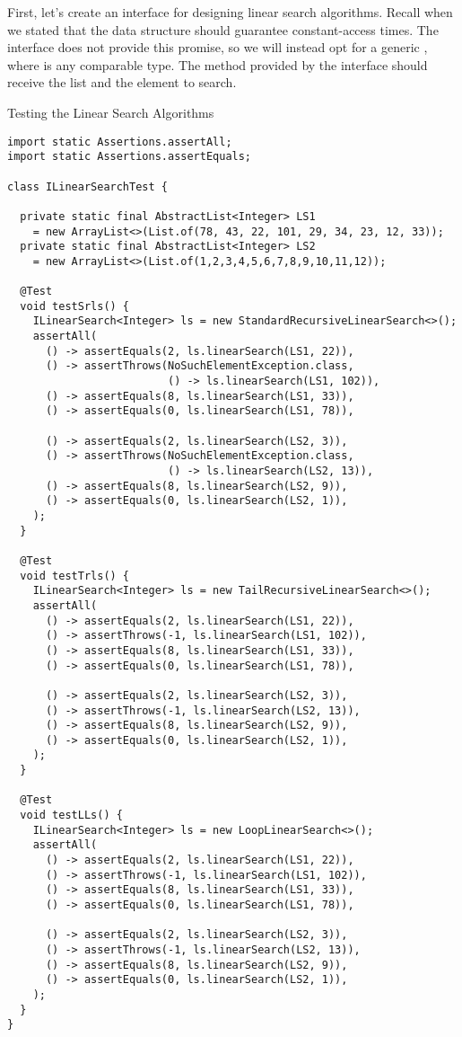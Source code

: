 First, let's create an interface for designing linear search algorithms. Recall when we stated that the data structure should guarantee constant-access times. The  interface does not provide this promise, so we will instead opt for a generic , where  is any comparable type. The method provided by the interface should receive the list and the element to search.

\begin{cl}{Testing the Linear Search Algorithms}
\begin{lstlisting}[language=MyJava]
import static Assertions.assertAll;
import static Assertions.assertEquals;

class ILinearSearchTest {

  private static final AbstractList<Integer> LS1 
    = new ArrayList<>(List.of(78, 43, 22, 101, 29, 34, 23, 12, 33));
  private static final AbstractList<Integer> LS2 
    = new ArrayList<>(List.of(1,2,3,4,5,6,7,8,9,10,11,12));

  @Test
  void testSrls() {
    ILinearSearch<Integer> ls = new StandardRecursiveLinearSearch<>();
    assertAll(
      () -> assertEquals(2, ls.linearSearch(LS1, 22)),
      () -> assertThrows(NoSuchElementException.class, 
                         () -> ls.linearSearch(LS1, 102)),
      () -> assertEquals(8, ls.linearSearch(LS1, 33)),
      () -> assertEquals(0, ls.linearSearch(LS1, 78)),

      () -> assertEquals(2, ls.linearSearch(LS2, 3)),
      () -> assertThrows(NoSuchElementException.class, 
                         () -> ls.linearSearch(LS2, 13)),
      () -> assertEquals(8, ls.linearSearch(LS2, 9)),
      () -> assertEquals(0, ls.linearSearch(LS2, 1)),
    );
  }

  @Test
  void testTrls() {
    ILinearSearch<Integer> ls = new TailRecursiveLinearSearch<>();
    assertAll(
      () -> assertEquals(2, ls.linearSearch(LS1, 22)),
      () -> assertThrows(-1, ls.linearSearch(LS1, 102)),
      () -> assertEquals(8, ls.linearSearch(LS1, 33)),
      () -> assertEquals(0, ls.linearSearch(LS1, 78)),

      () -> assertEquals(2, ls.linearSearch(LS2, 3)),
      () -> assertThrows(-1, ls.linearSearch(LS2, 13)),
      () -> assertEquals(8, ls.linearSearch(LS2, 9)),
      () -> assertEquals(0, ls.linearSearch(LS2, 1)),
    );
  }

  @Test
  void testLLs() {
    ILinearSearch<Integer> ls = new LoopLinearSearch<>();
    assertAll(
      () -> assertEquals(2, ls.linearSearch(LS1, 22)),
      () -> assertThrows(-1, ls.linearSearch(LS1, 102)),
      () -> assertEquals(8, ls.linearSearch(LS1, 33)),
      () -> assertEquals(0, ls.linearSearch(LS1, 78)),

      () -> assertEquals(2, ls.linearSearch(LS2, 3)),
      () -> assertThrows(-1, ls.linearSearch(LS2, 13)),
      () -> assertEquals(8, ls.linearSearch(LS2, 9)),
      () -> assertEquals(0, ls.linearSearch(LS2, 1)),
    );
  }
}
\end{lstlisting}
\end{cl}

